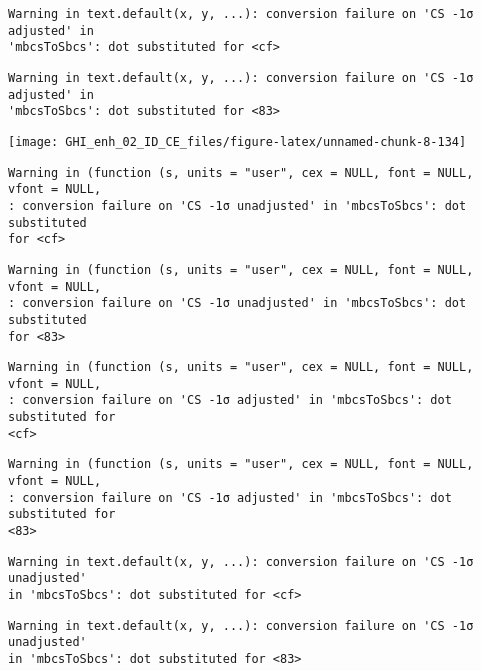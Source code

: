 \documentclass[
  10pt,
  a4paper,oneside]{article}
\begin{document}
\begin{verbatim}
Warning in text.default(x, y, ...): conversion failure on 'CS -1σ adjusted' in
'mbcsToSbcs': dot substituted for <cf>
\end{verbatim}

\begin{verbatim}
Warning in text.default(x, y, ...): conversion failure on 'CS -1σ adjusted' in
'mbcsToSbcs': dot substituted for <83>
\end{verbatim}

\begin{center}\texttt{[image: GHI\_enh\_02\_ID\_CE\_files/figure-latex/unnamed-chunk-8-134]} \end{center}

\begin{verbatim}
Warning in (function (s, units = "user", cex = NULL, font = NULL, vfont = NULL,
: conversion failure on 'CS -1σ unadjusted' in 'mbcsToSbcs': dot substituted
for <cf>
\end{verbatim}

\begin{verbatim}
Warning in (function (s, units = "user", cex = NULL, font = NULL, vfont = NULL,
: conversion failure on 'CS -1σ unadjusted' in 'mbcsToSbcs': dot substituted
for <83>
\end{verbatim}

\begin{verbatim}
Warning in (function (s, units = "user", cex = NULL, font = NULL, vfont = NULL,
: conversion failure on 'CS -1σ adjusted' in 'mbcsToSbcs': dot substituted for
<cf>
\end{verbatim}

\begin{verbatim}
Warning in (function (s, units = "user", cex = NULL, font = NULL, vfont = NULL,
: conversion failure on 'CS -1σ adjusted' in 'mbcsToSbcs': dot substituted for
<83>
\end{verbatim}

\begin{verbatim}
Warning in text.default(x, y, ...): conversion failure on 'CS -1σ unadjusted'
in 'mbcsToSbcs': dot substituted for <cf>
\end{verbatim}

\begin{verbatim}
Warning in text.default(x, y, ...): conversion failure on 'CS -1σ unadjusted'
in 'mbcsToSbcs': dot substituted for <83>
\end{verbatim}
\end{document}
